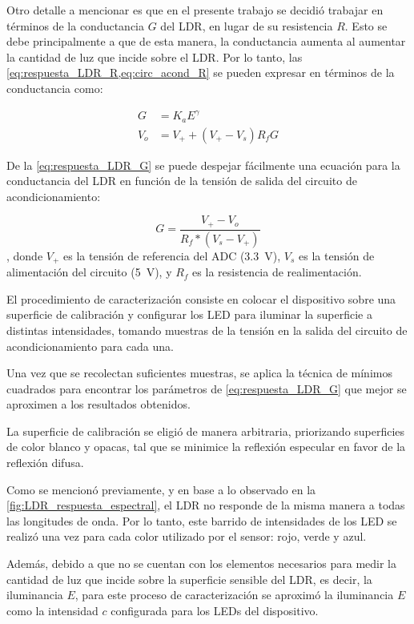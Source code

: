 \documentclass[12pt,a4paper,fleqn]{article}
\begin{document}
Otro detalle a mencionar es que en el presente trabajo se decidió trabajar en términos de la conductancia $G$ del LDR, en lugar de su resistencia $R$. Esto se debe principalmente a que de esta manera, la conductancia aumenta al aumentar la cantidad de luz que incide sobre el LDR. Por lo tanto, las \cref{eq:respuesta_LDR_R,eq:circ_acond_R} se pueden expresar en términos de la conductancia como:

\begin{align}
    G   & = K_a E^{\gamma} \label{eq:respuesta_LDR_G}             \\
    V_o & = V_{+} + (V_{+} - V_{s}) R_f G \label{eq:circ_acond_G}
\end{align}

De la \cref{eq:respuesta_LDR_G} se puede despejar fácilmente una ecuación para la conductancia del LDR en función de la tensión de salida del circuito de acondicionamiento:

\begin{equation} \label{eq:conductancia_Vo}
    G = \frac{V_+ - V_o}{R_f * (V_s-V_+)}
\end{equation}
% 
, donde $V_+$ es la tensión de referencia del ADC (\qty{3.3}{\V}), $V_s$ es la tensión de alimentación del circuito (\qty{5}{\V}), y $R_f$ es la resistencia de realimentación.

El procedimiento de caracterización consiste en colocar el dispositivo sobre una superficie de calibración y configurar los LED para iluminar la superficie a distintas intensidades, tomando muestras de la tensión en la salida del circuito de acondicionamiento para cada una.

Una vez que se recolectan suficientes muestras, se aplica la técnica de mínimos cuadrados para encontrar los parámetros de \cref{eq:respuesta_LDR_G} que mejor se aproximen a los resultados obtenidos.

La superficie de calibración se eligió de manera arbitraria, priorizando superficies de color blanco y opacas, tal que se minimice la reflexión especular en favor de la reflexión difusa.

Como se mencionó previamente, y en base a lo observado en la \cref{fig:LDR_respuesta_espectral}, el LDR no responde de la misma manera a todas las longitudes de onda. Por lo tanto, este barrido de intensidades de los LED se realizó una vez para cada color utilizado por el sensor: rojo, verde y azul.

Además, debido a que no se cuentan con los elementos necesarios para medir la cantidad de luz que incide sobre la superficie sensible del LDR, es decir, la iluminancia $E$, para este proceso de caracterización se aproximó la iluminancia $E$ como la intensidad $c$ configurada para los LEDs del dispositivo.
\end{document}
